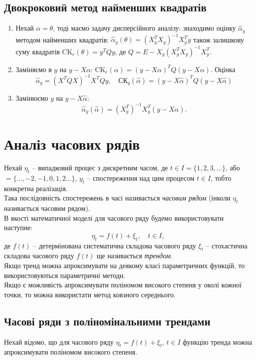 \subsection{Двокроковий метод найменших квадратів}
\begin{enumerate}
	\item Нехай $\alpha = \theta$, тоді маємо задачу дисперсійного аналізу: знаходимо оцінку $\widehat{\alpha}_g$ методом найменших квадратів: $\widehat{\alpha}_g(\theta)=(X_g^TX_g)^{-1}X_g^Ty$ також залишкову суму квадратів $\text{CK}_e(\theta)=y^TQy$, де $Q=E-X_g(X_g^TX_g)^{-1}X_g^T$.
	\item Заміняємо в $y$ на $y-X\alpha$: $\text{CK}_e(\alpha)=(y-X\alpha)^TQ(y-X\alpha)$. Оцінка \[ \widehat{\alpha}_g = (X^TQX)^{-1}X^TQy, \quad \text{СК}_q(\widehat{\alpha})=(y-X\widehat{\alpha})^TQ(y-X\widehat{\alpha}) \]
	\item Замінюємо $y$ на $y-X\widehat{\alpha}$: \[ \widehat{\alpha}_g(\widehat{\alpha}) = (X_g^T)^{-1}X_g^T(y-X\widehat{\alpha}). \]
\end{enumerate}
\section{Аналіз часових рядів}
Нехай $\eta_t$ -- випадковий процес з дискретним часом, де $t\in I=\{1,2,3,\ldots\}$, або $=\{\ldots,-2,-1,0,1,2\ldots\}$, $y_t$ -- спостереження над цим процесом $t\in I$, тобто конкретна реалізація. \\

Така послідовність спостережень в часі називається \textit{часовим рядом} (інколи $\eta_t$ називається часовим рядом). \\

В якості математичної моделі для часового ряду будемо використовувати наступне: \[ \eta_t = f(t) + \xi_t, \quad t \in I, \] де $f(t)$ -- детермінована систематична складова часового ряду $\xi_t$ -- стохастична складова часового ряду $f(t)$ ще називається \textit{трендом}. \\

Якщо тренд можна апроксимувати на деякому класі параметричних функцій, то використовуються параметричні методи. \\

Якщо є можливість апроксимувати поліномом високого степеня у околі кожної точки, то можна використати метод ковзного середнього. 
\subsection{Часові ряди з поліномінальними трендами}
Нехай відомо, що для часового ряду $\eta_t = f(t) + \xi_t$, $t\in I$ функцію тренда можна апроксимувати поліномом високого степеня. \\

